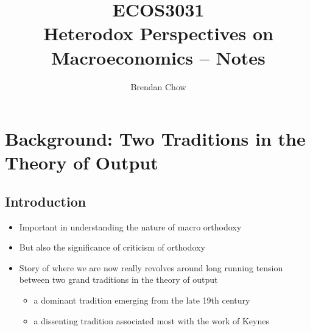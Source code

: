 \documentclass{article}
\begin{document}
	\title{{ECOS3031}\\{\normalsize{Heterodox Perspectives on Macroeconomics -- Notes}}}
	\author{Brendan Chow}
	\maketitle
	\newpage
	\pagestyle{fancynotes}
\section{Background: Two Traditions in the Theory of Output}
\subsection{Introduction}
	\begin{itemize}
		\item Important in understanding the nature of macro orthodoxy
		\item But also the significance of criticism of orthodoxy
		\item Story of where we are now really revolves around long running tension between two grand traditions in the theory of output
		\begin{itemize}
			\item a dominant tradition emerging from the late 19th century
			\item a dissenting tradition associated most with the work of Keynes
		\end{itemize}
	\end{itemize}
\end{document}
